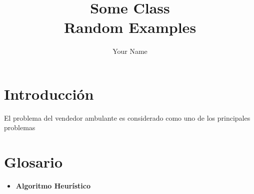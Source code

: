\documentclass{report}
\title{\Huge{Some Class}\\Random Examples}
\author{\huge{Your Name}}
\date{}
\begin{document}
\maketitle
\newpage%
\tableofcontents
\pagebreak

\chapter{Introducción}

El problema del vendedor ambulante es considerado como uno de los principales problemas

\chapter{Glosario}

\begin{itemize}
  \item \textbf{Algoritmo Heurístico}
\end{itemize}
\end{document}
